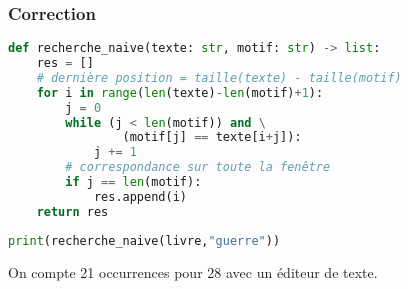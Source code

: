 \documentclass[svgnames,11pt]{beamer}
\begin{document}
\begin{frame}[fragile]
    \frametitle{Correction}

    \begin{center}
    \begin{lstlisting}[language=Python , basicstyle=\ttfamily\small, xleftmargin=1em, xrightmargin=-1em]
def recherche_naive(texte: str, motif: str) -> list:
    res = []
    # dernière position = taille(texte) - taille(motif)
    for i in range(len(texte)-len(motif)+1):
        j = 0
        while (j < len(motif)) and \
                (motif[j] == texte[i+j]):
            j += 1   
        # correspondance sur toute la fenêtre  
        if j == len(motif):  
            res.append(i)
    return res
\end{lstlisting}
    \begin{lstlisting}[language=Python , basicstyle=\ttfamily\small, xleftmargin=1em, xrightmargin=-1em]
print(recherche_naive(livre,"guerre"))
\end{lstlisting}
    \end{center}
On compte 21 occurrences pour 28 avec un éditeur de texte.
\end{frame}
\end{document}
